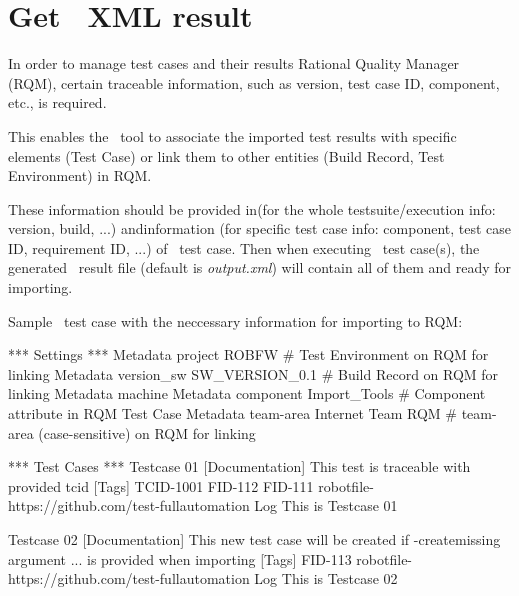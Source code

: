 



\hypertarget{description-get-robotframework-xml-result}{%
\section{Get \rfwcore\ XML result}
\label{description-get-robotframework-xml-result}}

In order to manage test cases and their results Rational Quality Manager (RQM), 
certain traceable information, such as version, test case ID, component, etc., 
is required. 

This enables the \pkg\ tool to associate the imported test results with 
specific elements (Test Case) or link them to other entities (Build Record, 
Test Environment) in RQM.

These information should be provided in(for the whole
testsuite/execution info: version, build, ...) and\rcode{{[}Tags{]}}information
(for specific test case info: component, test case ID, requirement ID, ...) of
\rfwcore\ test case.
Then when executing \rfwcore\ test case(s), the generated \rfwcore\ result file 
(default is \emph{output.xml}) will contain all of them and ready for importing.

Sample \rfwcore\ test case with the neccessary information for importing to RQM:

\begin{robotcode}[caption=Sample \rfwcore\ test case,
                  linebackgroundcolor=\hlcode{2,3,4}]
*** Settings ***
Metadata   project      ROBFW             # Test Environment on RQM for linking
Metadata   version_sw   SW_VERSION_0.1    # Build Record on RQM for linking
Metadata   machine      %
Metadata   component    Import_Tools      # Component attribute in RQM Test Case
Metadata   team-area    Internet Team RQM  # team-area (case-sensitive) on RQM for linking

*** Test Cases ***
Testcase 01
   [Documentation]   This test is traceable with provided tcid
   [Tags]   TCID-1001   FID-112   FID-111    robotfile-https://github.com/test-fullautomation
   Log      This is Testcase 01

Testcase 02
   [Documentation]  This new test case will be created if -createmissing argument
               ...  is provided when importing
   [Tags]   FID-113  robotfile-https://github.com/test-fullautomation
   Log      This is Testcase 02
\end{robotcode}


